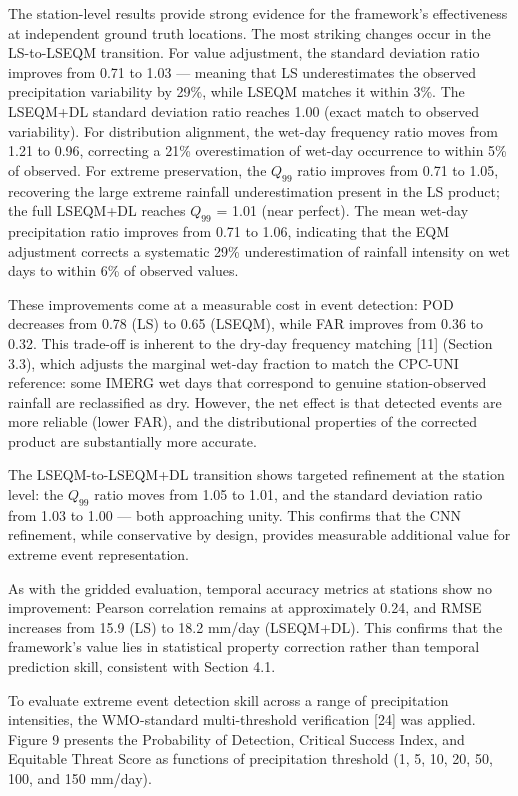 \documentclass[
]{article}
\begin{document}
The station-level results provide strong evidence for the framework's
effectiveness at independent ground truth locations. The most striking
changes occur in the LS-to-LSEQM transition. For value adjustment, the
standard deviation ratio improves from 0.71 to 1.03 --- meaning that LS
underestimates the observed precipitation variability by 29\%, while
LSEQM matches it within 3\%. The LSEQM+DL standard deviation ratio
reaches 1.00 (exact match to observed variability). For distribution
alignment, the wet-day frequency ratio moves from 1.21 to 0.96,
correcting a 21\% overestimation of wet-day occurrence to within 5\% of
observed. For extreme preservation, the \(Q_{99}\) ratio improves from
0.71 to 1.05, recovering the large extreme rainfall underestimation
present in the LS product; the full LSEQM+DL reaches \(Q_{99}\) = 1.01
(near perfect). The mean wet-day precipitation ratio improves from 0.71
to 1.06, indicating that the EQM adjustment corrects a systematic 29\%
underestimation of rainfall intensity on wet days to within 6\% of
observed values.

These improvements come at a measurable cost in event detection: POD
decreases from 0.78 (LS) to 0.65 (LSEQM), while FAR improves from 0.36
to 0.32. This trade-off is inherent to the dry-day frequency matching
{[}11{]} (Section 3.3), which adjusts the marginal wet-day fraction to
match the CPC-UNI reference: some IMERG wet days that correspond to
genuine station-observed rainfall are reclassified as dry. However, the
net effect is that detected events are more reliable (lower FAR), and
the distributional properties of the corrected product are substantially
more accurate.

The LSEQM-to-LSEQM+DL transition shows targeted refinement at the
station level: the \(Q_{99}\) ratio moves from 1.05 to 1.01, and the
standard deviation ratio from 1.03 to 1.00 --- both approaching unity.
This confirms that the CNN refinement, while conservative by design,
provides measurable additional value for extreme event representation.

As with the gridded evaluation, temporal accuracy metrics at stations
show no improvement: Pearson correlation remains at approximately 0.24,
and RMSE increases from 15.9 (LS) to 18.2 mm/day (LSEQM+DL). This
confirms that the framework's value lies in statistical property
correction rather than temporal prediction skill, consistent with
Section 4.1.

To evaluate extreme event detection skill across a range of
precipitation intensities, the WMO-standard multi-threshold verification
{[}24{]} was applied. Figure 9 presents the Probability of Detection,
Critical Success Index, and Equitable Threat Score as functions of
precipitation threshold (1, 5, 10, 20, 50, 100, and 150 mm/day).
\end{document}
